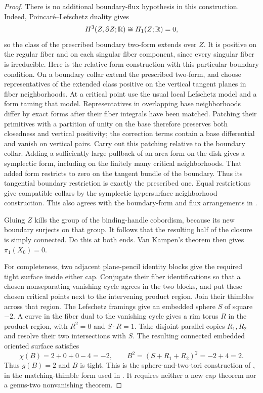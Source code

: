 \begin{proof}
There is no additional boundary-flux hypothesis in this construction.
Indeed, Poincar\'e--Lefschetz duality gives
\[
 H^3(Z,\partial Z;\mathbb R)\cong H_1(Z;\mathbb R)=0,
\]
so the class of the prescribed boundary two-form extends over $Z$.
It is positive on the regular fiber and on each singular fiber component,
since every singular fiber is irreducible.  Here is the relative form
construction with this particular boundary condition.  On a boundary
collar extend the prescribed two-form, and choose representatives of the
extended class positive on the vertical tangent planes in fiber
neighborhoods.  At a critical point use the usual local Lefschetz model
and a form taming that model.  Representatives in overlapping base
neighborhoods differ by exact forms after their fiber integrals have been
matched.  Patching their primitives with a partition of unity on the base
therefore preserves both closedness and vertical positivity; the correction
terms contain a base differential and vanish on vertical pairs.  Carry
out this patching relative to the boundary collar.  Adding a sufficiently
large pullback of an area form on the disk gives a symplectic form,
including on the finitely many critical neighborhoods.  That added form
restricts to zero on the tangent bundle of the boundary.  Thus its
tangential boundary restriction is exactly the prescribed one.  Equal
restrictions give compatible collars by the symplectic hypersurface
neighborhood construction.  This also agrees with the boundary-form and
flux arrangements in
\cite[Lemmas~3.4--3.5 and Remark~3.6]{Eliashberg2004}.

Gluing $Z$ kills the group of the binding-handle cobordism, because its
new boundary surjects on that group.  It follows that the resulting half
of the closure is simply connected.  Do this at both ends.  Van Kampen's
theorem then gives $\pi_1(X_0)=0$.

For completeness, two adjacent plane-pencil identity blocks give the
required tight surface inside either cap.  Conjugate their fiber
identifications so that a chosen nonseparating vanishing cycle agrees in
the two blocks, and put these chosen critical points next to the
intervening product region.  Join their thimbles across that region.  The
Lefschetz framings give an embedded sphere $S$ of square $-2$.  A curve in
the fiber dual to the vanishing cycle gives a rim torus $R$ in the product
region, with $R^2=0$ and $S\cdot R=1$.  Take disjoint parallel copies
$R_1,R_2$ and resolve their two intersections with $S$.  The resulting
connected embedded oriented surface satisfies
\[
 \chi(B)=2+0+0-4=-2,
 \qquad B^2=(S+R_1+R_2)^2=-2+4=2.
\]
Thus $g(B)=2$ and $B$ is tight.  This is the sphere-and-two-tori
construction of \cite[Corollary~8.5]{KronheimerMrowka1995}, in the
matching-thimble form used in
\cite[Lemma~4.6, arXiv version~2]{Sivek2015}.  It requires neither a new
cap theorem nor a genus-two nonvanishing theorem.


\end{proof}
